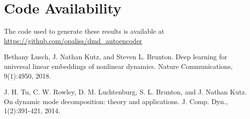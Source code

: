 \documentclass[twocolumn, letterpaper]{scrartcl}
\begin{document}
    
\section*{\fontsize{15}{15} \textbf{Code Availability}}
    The code used to generate these results is available at \url{https://github.com/opaliss/dmd_autoencoder} 

\begin{thebibliography}{9}

    Bethany Lusch, J. Nathan Kutz, and Steven L. Brunton. Deep learning for universal linear embeddings of nonlinear dynamics. Nature Communications, 9(1):4950, 2018.
    
    J. H. Tu, C. W. Rowley, D. M. Luchtenburg, S. L. Brunton, and J. Nathan Kutz. On dynamic mode decomposition: theory and applications. J. Comp. Dyn., 1(2):391-421, 2014. 

\end{thebibliography}
\end{document}
